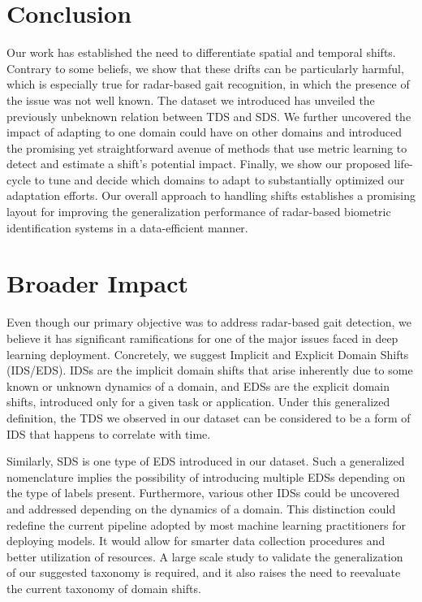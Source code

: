 \documentclass{article}
\begin{document}
\section{Conclusion}
Our work has established the need to differentiate spatial and temporal shifts. Contrary to some beliefs, we show that these drifts can be particularly harmful, which is especially true for radar-based gait recognition, in which the presence of the issue was not well known. The dataset we introduced has unveiled the previously unbeknown relation between TDS and SDS. We further uncovered the impact of adapting to one domain could have on other domains and introduced the promising yet straightforward avenue of methods that use metric learning to detect and estimate a shift's potential impact. Finally, we show our proposed life-cycle to tune and decide which domains to adapt to substantially optimized our adaptation efforts. Our overall approach to handling shifts establishes a promising layout for improving the generalization performance of radar-based biometric identification systems in a data-efficient manner.

\section*{Broader Impact}
Even though our primary objective was to address radar-based gait detection, we believe it has significant ramifications for one of the major issues faced in deep learning deployment. Concretely, we suggest Implicit and Explicit Domain Shifts (IDS/EDS). IDSs are the implicit domain shifts that arise inherently due to some known or unknown dynamics of a domain, and EDSs are the explicit domain shifts, introduced only for a given task or application. Under this generalized definition, the TDS we observed in our dataset can be considered to be a form of IDS that happens to correlate with time.

Similarly, SDS is one type of EDS introduced in our dataset. Such a generalized nomenclature implies the possibility of introducing multiple EDSs depending on the type of labels present. Furthermore, various other IDSs could be uncovered and addressed depending on the dynamics of a domain. This distinction could redefine the current pipeline adopted by most machine learning practitioners for deploying models. It would allow for smarter data collection procedures and better utilization of resources. A large scale study to validate the generalization of our suggested taxonomy is required, and it also raises the need to reevaluate the current taxonomy of domain shifts.
\end{document}
